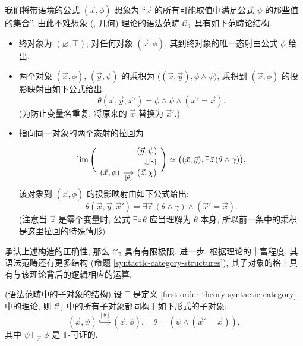 \begin{remark}
	{}
	我们将带语境的公式 $(\vec x,\phi)$ 想象为 ``$\vec x$ 的所有可能取值中满足公式 $\psi$ 的那些值的集合''.
	由此不难想象\regular{} (\coherent{}, 几何) 理论的语法范畴 $\mathcal C_{\mathbb T}$ 具有如下范畴论结构. %
	\begin{itemize}
		\item 终对象为 $(\varnothing,\top)$; 对任何对象 $(\vec x,\phi)$, 其到终对象的唯一态射由公式 $\phi$ 给出.
		\item 两个对象 $(\vec x,\phi)$, $(\vec y,\psi)$ 的乘积为 $\big((\vec x,\vec y),\phi\land\psi\big)$, 乘积到 $(\vec x,\phi)$ 的投影映射由如下公式给出:
		$$
		\theta (\vec x,\vec y,\vec x')=\phi\land\psi\land (\vec x'=\vec x).
		$$
		(为防止变量名重复, 将原来的 $\vec x$ 替换为 $\vec x'$.)
		\item 指向同一对象的两个态射的拉回为
		\[
		\lim\Bigg(\begin{tikzcd}[ampersand replacement=\&,sep=small]
			\& {(\vec y,\psi)} \\
			{(\vec x,\phi)} \& {(\vec z,\chi)}
			\arrow["{[\gamma]}", from=1-2, to=2-2]
			\arrow["{[\theta]}"', from=2-1, to=2-2]
		\end{tikzcd}\Bigg)\simeq
		\big((\vec x,\vec y),\exists \vec z\,(\theta\land\gamma)\big),
		\]
		该对象到 $(\vec x,\phi)$ 的投影映射由如下公式给出:
		$$
		\theta (\vec x,\vec y,\vec x') = \exists \vec z\,(\theta\land\gamma)\land(\vec x'=\vec x).
		$$
		(注意当 $\vec z$ 是零个变量时, 公式 $\exists z\, \theta$ 应当理解为 $\theta$ 本身, 所以前一条中的乘积是这里拉回的特殊情形)
	\end{itemize}
	承认上述构造的正确性, 那么 $\mathcal C_{\mathbb T}$ 具有有限极限. 进一步, 根据理论的丰富程度, 其语法范畴还有更多结构 (命题 \ref{syntactic-category-structures}), 其子对象的格上具有与该理论背后的逻辑相应的运算.
\end{remark}

\begin{prop}
	{(语法范畴中的子对象的结构)}
	设 $\mathbb T$ 是定义 \ref{first-order-theory-syntactic-category} 中的理论, 则
	$\mathcal C_{\mathbb T}$ 中的所有子对象都同构于如下形式的子对象:
	\[
	(\vec x,\psi)\overset{[\theta]}{\hookrightarrow} (\vec x,\phi),\quad \theta = (\psi\land (\vec x'=\vec x)),
	\]
	其中 $\psi\vdash_{\vec x}\phi$ 是 $\mathbb T$-可证的.
\end{prop}

